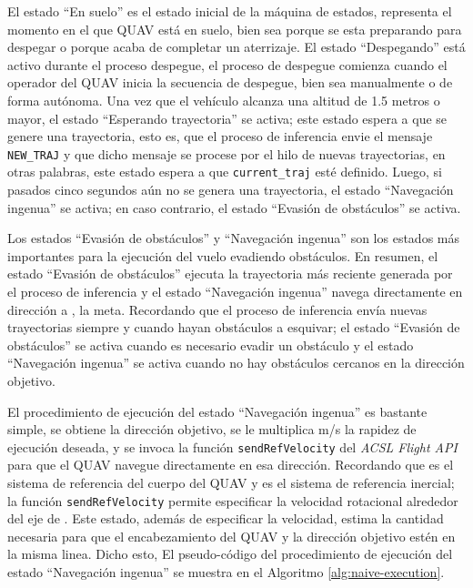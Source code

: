 El estado ``En suelo'' es el estado inicial de la máquina de estados, representa el momento en el que QUAV está en suelo, bien sea porque se esta preparando para despegar o porque acaba de completar un aterrizaje. El estado ``Despegando'' está activo durante el proceso despegue, el proceso de despegue comienza cuando el operador del QUAV inicia la secuencia de despegue, bien sea manualmente o de forma autónoma. Una vez que el vehículo alcanza una altitud de 1.5 metros o mayor, el estado ``Esperando trayectoria'' se activa; este estado espera a que se genere una trayectoria, esto es, que el proceso de inferencia envie el mensaje \texttt{NEW\_TRAJ} y que dicho mensaje se procese por el hilo de nuevas trayectorias, en otras palabras, este estado espera a que \texttt{current\_traj} esté definido. Luego, si pasados cinco segundos aún no se genera una trayectoria, el estado ``Navegación ingenua'' se activa; en caso contrario, el estado ``Evasión de obstáculos'' se activa.

Los estados ``Evasión de obstáculos'' y ``Navegación ingenua'' son los estados más importantes para la ejecución del vuelo evadiendo obstáculos. En resumen, el estado ``Evasión de obstáculos'' ejecuta la trayectoria más reciente generada por el proceso de inferencia y el estado ``Navegación ingenua'' navega directamente en dirección a , la meta. Recordando que el proceso de inferencia envía nuevas trayectorias siempre y cuando hayan obstáculos a esquivar; el estado ``Evasión de obstáculos'' se activa cuando es necesario evadir un obstáculo y el estado ``Navegación ingenua'' se activa cuando no hay obstáculos cercanos en la dirección objetivo. 

El procedimiento de ejecución del estado ``Navegación ingenua'' es bastante simple, se obtiene la dirección objetivo, se le multiplica  m/s la rapidez de ejecución deseada, y se invoca la función \texttt{sendRefVelocity} del \textit{ACSL Flight API} para que el QUAV navegue directamente en esa dirección. Recordando que  es el sistema de referencia del cuerpo del QUAV y  es el sistema de referencia inercial; la función \texttt{sendRefVelocity} permite especificar  la velocidad rotacional alrededor del eje  de . Este estado, además de especificar la velocidad, estima la cantidad  necesaria para que el encabezamiento del QUAV y la dirección objetivo estén en la misma linea. Dicho esto, El pseudo-código del procedimiento de ejecución del estado ``Navegación ingenua'' se muestra en el Algoritmo \ref{alg:naive-execution}.

